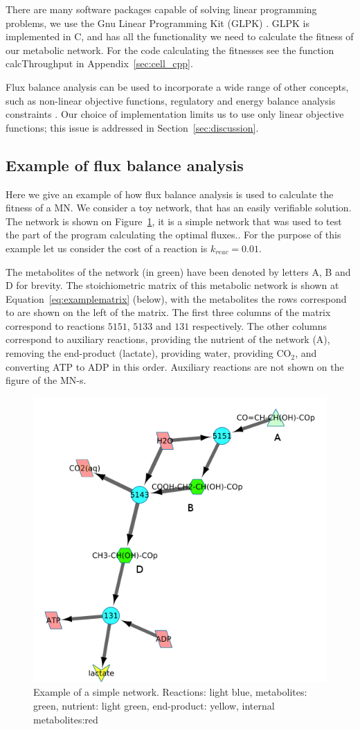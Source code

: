 \documentclass[a4paper,12pt]{article}
\begin{document}
	
	There are many software packages capable of solving linear programming problems, we use the Gnu Linear Programming Kit (GLPK) \cite{glpk}. GLPK is implemented in C, and has all the functionality we need to calculate the fitness of our metabolic network. For the code calculating the fitnesses see the function calcThroughput in Appendix~\ref{sec:cell_cpp}.

	Flux balance analysis can be used to incorporate a wide range of other concepts, such as non-linear objective functions, regulatory and energy balance analysis constraints \cite{fbaconstraints}. Our choice of implementation limits us to use only linear objective functions; this issue is addressed in Section~\ref{sec:discussion}.

\subsection*{Example of flux balance analysis}
\label{sub:example_of_flux_balance_analysis}

Here we give an example of how flux balance analysis is used to calculate the fitness of a MN. We consider a toy network, that has an easily verifiable solution. The network is shown on Figure~\ref{fig:examplenetwork}, it is a simple network that was used to test the part of the program calculating the optimal fluxes.. For the purpose of this example let us consider the cost of a reaction is $k_{reac}=0.01$.


	The metabolites of the network (in green) have been denoted by letters A, B and D for brevity. The stoichiometric matrix of this metabolic network is shown at Equation~\ref{eq:examplematrix} (below), with the metabolites the rows correspond to are shown on the left of the matrix. The first three columns of the matrix correspond to reactions $5151$, $5133$ and $131$ respectively. The other columns correspond to auxiliary reactions, providing the nutrient of the network (A), removing the end-product (lactate), providing water, providing CO$_2$, and converting ATP to ADP in this order. Auxiliary reactions are not shown on the figure of the MN-s. 

\begin{figure}[htbp]
	\centering
	\includegraphics[width=0.5\linewidth]{initial_network_ABC.png}
	\caption{Example of a simple network. Reactions: light blue, metabolites: green, nutrient: light green, end-product: yellow, internal metabolites:red}
	\label{fig:examplenetwork}
\end{figure}
\end{document}
